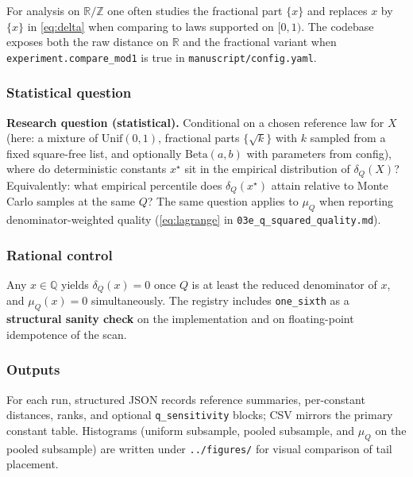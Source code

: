 \documentclass[
]{article}
\begin{document}
For analysis on \(\mathbb{R}/\mathbb{Z}\) one often studies the
fractional part \(\{x\}\) and replaces \(x\) by \(\{x\}\) in
\eqref{eq:delta} when comparing to laws supported on \([0,1)\). The
codebase exposes both the raw distance on \(\mathbb{R}\) and the
fractional variant when \texttt{experiment.compare\_mod1} is true in
\texttt{manuscript/config.yaml}.

\subsubsection{Statistical question}\label{statistical-question}

\textbf{Research question (statistical).} Conditional on a chosen
reference law for \(X\) (here: a mixture of \(\mathrm{Unif}(0,1)\),
fractional parts \(\{\sqrt{k}\}\) with \(k\) sampled from a fixed
square-free list, and optionally \(\mathrm{Beta}(a,b)\) with parameters
from config), where do deterministic constants \(x^\star\) sit in the
empirical distribution of \(\delta_Q(X)\)? Equivalently: what empirical
percentile does \(\delta_Q(x^\star)\) attain relative to Monte Carlo
samples at the same \(Q\)? The same question applies to \(\mu_Q\) when
reporting denominator-weighted quality (\eqref{eq:lagrange} in
\texttt{03e\_q\_squared\_quality.md}).

\subsubsection{Rational control}\label{rational-control}

Any \(x \in \mathbb{Q}\) yields \(\delta_Q(x)=0\) once \(Q\) is at least
the reduced denominator of \(x\), and \(\mu_Q(x)=0\) simultaneously. The
registry includes \texttt{one\_sixth} as a \textbf{structural sanity
check} on the implementation and on floating-point idempotence of the
scan.

\subsubsection{Outputs}\label{outputs}

For each run, structured JSON records reference summaries, per-constant
distances, ranks, and optional \texttt{q\_sensitivity} blocks; CSV
mirrors the primary constant table. Histograms (uniform subsample,
pooled subsample, and \(\mu_Q\) on the pooled subsample) are written
under \texttt{../figures/} for visual comparison of tail placement.

\newpage
\end{document}
